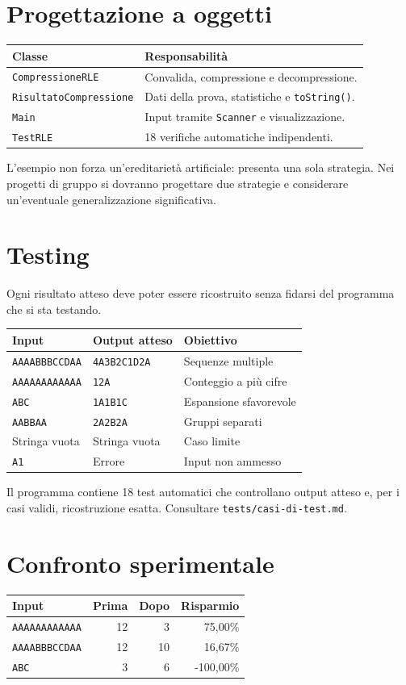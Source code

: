 \documentclass[11pt,a4paper]{article}
\begin{document}
\section{Progettazione a oggetti}
\begin{tabularx}{\linewidth}{@{}lX@{}}
\toprule
Classe & Responsabilità\\
\midrule
\texttt{CompressioneRLE} & Convalida, compressione e decompressione.\\
\texttt{RisultatoCompressione} & Dati della prova, statistiche e \texttt{toString()}.\\
\texttt{Main} & Input tramite \texttt{Scanner} e visualizzazione.\\
\texttt{TestRLE} & 18 verifiche automatiche indipendenti.\\
\bottomrule
\end{tabularx}

L'esempio non forza un'ereditarietà artificiale: presenta una sola strategia. Nei progetti di gruppo si dovranno progettare due strategie e considerare un'eventuale generalizzazione significativa.

\newpage
\section{Testing}
Ogni risultato atteso deve poter essere ricostruito senza fidarsi del programma che si sta testando.

\begin{tabularx}{\linewidth}{@{}l l X@{}}
\toprule
Input & Output atteso & Obiettivo\\
\midrule
\texttt{AAAABBBCCDAA} & \texttt{4A3B2C1D2A} & Sequenze multiple\\
\texttt{AAAAAAAAAAAA} & \texttt{12A} & Conteggio a più cifre\\
\texttt{ABC} & \texttt{1A1B1C} & Espansione sfavorevole\\
\texttt{AABBAA} & \texttt{2A2B2A} & Gruppi separati\\
Stringa vuota & Stringa vuota & Caso limite\\
\texttt{A1} & Errore & Input non ammesso\\
\bottomrule
\end{tabularx}

Il programma contiene 18 test automatici che controllano output atteso e, per i casi validi, ricostruzione esatta. Consultare \texttt{tests/casi-di-test.md}.

\section{Confronto sperimentale}
\begin{tabularx}{\linewidth}{@{}X r r r@{}}
\toprule
Input & Prima & Dopo & Risparmio\\
\midrule
\texttt{AAAAAAAAAAAA} & 12 & 3 & 75,00\%\\
\texttt{AAAABBBCCDAA} & 12 & 10 & 16,67\%\\
\texttt{ABC} & 3 & 6 & -100,00\%\\
\bottomrule
\end{tabularx}
\end{document}
